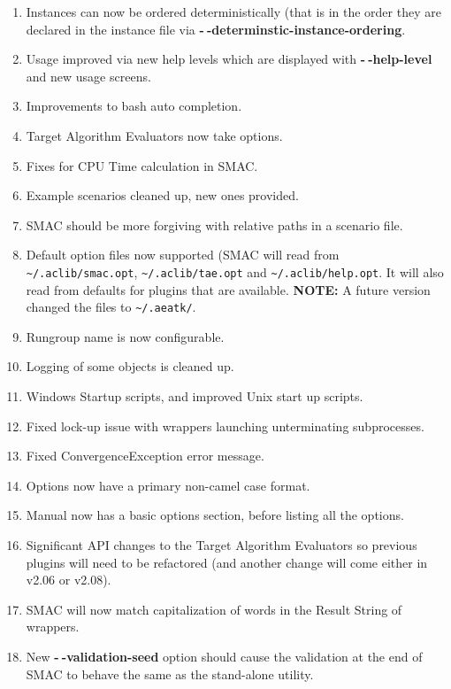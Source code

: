 \documentclass[11pt,letterpaper,oneside]{article}
\begin{document}
\begin{description}
\begin{enumerate}
					 \item Instances can now be ordered deterministically (that is in the order they are declared in the instance file via \textbf{-$~\!$-determinstic-instance-ordering}.
					 \item Usage improved via new help levels which are displayed with \textbf{-$~\!$-help-level} and new usage screens.
					 \item Improvements to bash auto completion.
					 \item Target Algorithm Evaluators now take options.
					 \item Fixes for CPU Time calculation in SMAC.
					 \item Example scenarios cleaned up, new ones provided.
					 \item SMAC should be more forgiving with relative paths in a scenario file.
					 \item Default option files now supported (SMAC will read from \texttt{\textasciitilde/.aclib/smac.opt}, \texttt{\textasciitilde/.aclib/tae.opt} and \texttt{\textasciitilde/.aclib/help.opt}. It will also read from defaults for plugins that are available. \textbf{NOTE:} A future version changed the files to \texttt{\textasciitilde/.aeatk/}.
					 \item Rungroup name is now configurable.
					 \item Logging of some objects is cleaned up.
					 \item Windows Startup scripts, and improved Unix start up scripts.
					 \item Fixed lock-up issue with wrappers launching unterminating subprocesses.
					 \item Fixed ConvergenceException error message.
					 \item Options now have a primary non-camel case format.
					 \item Manual now has a basic options section, before listing all the options.
					 \item Significant API changes to the Target Algorithm Evaluators so previous plugins will need to be refactored (and another change will come either in v2.06 or v2.08).
					 \item SMAC will now match capitalization of words in the Result String of wrappers.
					 \item New \textbf{-$~\!$-validation-seed} option should cause the validation at the end of SMAC to behave the same as the stand-alone utility.
                  \end{enumerate}


\end{description}
\end{document}
